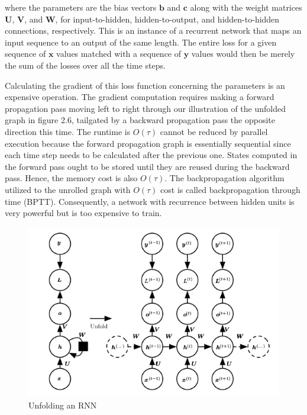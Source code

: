 where the parameters are the bias vectors $\textbf{b}$ and $\textbf{c}$ along with the weight matrices $\textbf{U}$,
$\textbf{V}$, and $\textbf{W}$, for input-to-hidden, hidden-to-output, and hidden-to-hidden connections, respectively.
This is an instance of a recurrent network that maps an input sequence to an output of the same length.
The entire loss for a given sequence of $\textbf{x}$ values matched with a sequence of $\textbf{y}$ values would
then be merely the sum of the losses over all the time steps.

Calculating the gradient of this loss function concerning the parameters is an expensive operation.
The gradient computation requires making a forward propagation pass moving left to right through our illustration
of the unfolded graph in figure 2.6, tailgated by a backward propagation pass the opposite direction this time.
The runtime is $O(\tau)$ cannot be reduced by parallel execution because the forward propagation graph is essentially
sequential since each time step needs to be calculated after the previous one.
States computed in the forward pass ought to be stored until they are reused during the backward pass.
Hence, the memory cost is also $O(\tau)$.
The backpropagation algorithm utilized to the unrolled graph with $O(\tau)$ cost is called backpropagation through time (BPTT).
Consequently, a network with recurrence between hidden units is very powerful but is too expensive to train.

\begin{figure}[H]
    \centering
    \includegraphics[scale=0.8]{./images/background/rnn_unfolded.png}
    \caption{Unfolding an RNN}
    \label{fig:rnn_unfolded}
\end{figure}

